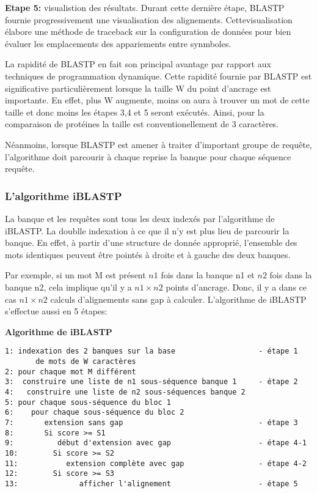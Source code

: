 {\bf Etape 5:} visualistion des résultats. Durant cette dernière
étape, BLASTP fournie progressivement une visualisation
des alignements. Cettevisualisation élabore une méthode
de traceback sur la configuration de données pour bien
évaluer les emplacements des appariements entre
synmboles.

La rapidité de BLASTP en fait son principal avantage
par rapport aux techniques de programmation dynamique.
Cette rapidité fournie par BLASTP  est significative
particulièrement lorsque la taille W du point d'ancrage
est importante. En effet, plus W augmente, moins on
aura à trouver un mot de cette taille et donc moins les
étapes 3,4 et 5 seront exécutés. Ainsi, pour la
comparaison de protéines la taille est
conventionellement de 3 caractères.

Néanmoins, lorsque BLASTP est amener à traiter
d'important groupe de requête, l'algorithme doit
parcourir à chaque reprise la banque pour chaque
séquence requête.

\subsubsection{L'algorithme iBLASTP}

La banque et les requêtes sont tous les deux indexés
par l'algorithme de iBLASTP. La doublle indexation à ce
que il n'y est plus lieu de parcourir la banque.
En effet, à partir d'une structure de donnée
approprié, l'ensemble des mots identiques peuvent être
pointés à droite et à gauche des deux banques.

Par exemple, si un mot M est présent $n1$ fois dans la
banque n1 et $n2$ fois dans la banque n2, cela implique
qu'il y a $n1 \times n2$ points d'ancrage.
Donc, il y a dans ce cas $n1 \times n2$ calculs
d'alignements sans gap à calculer.
L'algorithme de iBLASTP s'effectue aussi en 5 étapes:

{\bf Algorithme de iBLASTP}

\begin{verbatim}
1: indexation des 2 banques sur la base                   - étape 1
       de mots de W caractères
2: pour chaque mot M différent
3:  construire une liste de n1 sous-séquence banque 1     - étape 2
4:   construire une liste de n2 sous-séquences banque 2
5: pour chaque sous-séquence du bloc 1
6:    pour chaque sous-séquence du bloc 2
7:       extension sans gap                               - étape 3
8:       Si score >= S1
9:          début d'extension avec gap                    - étape 4-1
10:        Si score >= S2
11:           extension complète avec gap                 - étape 4-2
12:        Si score >= S3
13:              afficher l'alignement                    - étape 5
\end{verbatim}

